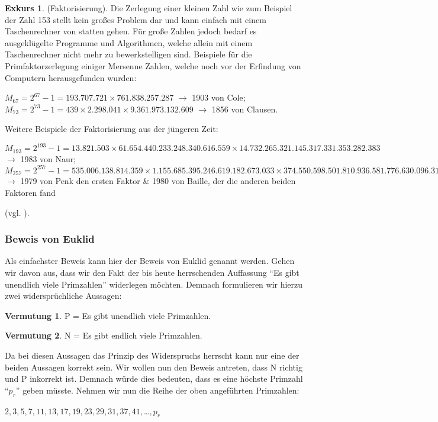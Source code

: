 \documentclass[12pt,a4paper]{article}
\theoremstyle{definition}
\newtheorem{vermutung}{Vermutung}[subsection]
\newtheorem{exkurs}{Exkurs}
\begin{document}
\begin{exkurs}(Faktorisierung).\newline
Die Zerlegung einer kleinen Zahl wie zum Beispiel der Zahl 153 stellt kein großes Problem dar und kann einfach mit einem Taschenrechner von statten gehen.
Für große Zahlen jedoch bedarf es ausgeklügelte Programme und Algorithmen, welche allein mit einem Taschenrechner nicht mehr zu bewerkstelligen sind.\newline
Beispiele für die Primfaktorzerlegung einiger Mersenne Zahlen, welche noch vor der Erfindung von Computern herausgefunden wurden:
\begin{center}
$M_{67} = 2^{67}-1 = 193.707.721\times761.838.257.287$ $\rightarrow$ 1903 von Cole;\\
$M_{73} = 2^{73}-1 = 439\times2.298.041\times9.361.973.132.609$ $\rightarrow$ 1856 von Clausen.\\
\end{center}
Weitere Beispiele der Faktorisierung aus der jüngeren Zeit:
\begin{center}
$M_{193} = 2^{193}-1 = 13.821.503\times61.654.440.233.248.340.616.559\times14.732.265.321.145.317.331.353.282.383$ $\rightarrow$ 1983 von Naur;\\
$M_{257} = 2^{257}-1 = 535.006.138.814.359\times1.155.685.395.246.619.182.673.033\times374.550.598.501.810.936.581.776.630.096.313.181.393$ $\rightarrow$ 1979 von Penk den ersten Faktor \& 1980 von Baille, der die anderen beiden Faktoren fand\end{center} (vgl. \cite[125--128]{Ribenboim2006}).\end{exkurs}

\subsubsection{Beweis von Euklid}\label{Beweis von Euklid}
Als einfachster Beweis kann hier der Beweis von Euklid genannt werden.
Gehen wir davon aus, dass wir den Fakt der bis heute herrschenden Auffassung “Es gibt unendlich viele Primzahlen” widerlegen möchten.
Demnach formulieren wir hierzu zwei widersprüchliche Aussagen:
\begin{vermutung} P = Es gibt unendlich viele Primzahlen.\end{vermutung}
\begin{vermutung}\label{vermutung} N = Es gibt endlich viele Primzahlen.\end{vermutung}

Da bei diesen Aussagen das Prinzip des Widerspruchs herrscht kann nur eine der beiden Aussagen korrekt sein.
Wir wollen nun den Beweis antreten, dass N richtig und P inkorrekt ist.
Demnach würde dies bedeuten, dass es eine höchste Primzahl “$p_r$” geben müsste.
Nehmen wir nun die Reihe der oben angeführten Primzahlen:
\begin{center}
$2, 3, 5, 7, 11, 13, 17, 19, 23, 29, 31, 37, 41, $…$, p_r$
\end{center}
\end{document}
